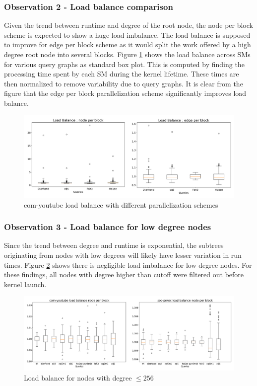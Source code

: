 {\subsubsection*{Observation 2 - Load balance comparison}
Given the trend between runtime and degree of the root node, the node per block scheme is expected to show a huge load imbalance.
The load balance is supposed to improve for edge per block scheme as it would split the work offered by a high degree root node into several blocks.
Figure \ref{fig:load-balance-baseline} shows the load balance across SMs for various query graphs as standard box plot. This is computed by finding the processing time spent by each SM during the kernel lifetime. These times are then normalized to remove variability due to query graphs. It is clear from the figure that the edge per block parallelization scheme significantly improves load balance.
\begin{figure}
    \includegraphics[width=\textwidth]{fig/improvements/yt_lb-baseline_byedge.png}
    \caption{com-youtube load balance with different parallelization schemes}
    \label{fig:load-balance-baseline}
\end{figure}

\subsubsection*{Observation 3 - Load balance for low degree nodes}
Since the trend between degree and runtime is exponential, the subtrees originating from nodes with low degrees will likely have lesser variation in run times.
Figure \ref{fig:load-balance-LD} shows there is negligible load imbalance for low degree nodes.
For these findings, all nodes with degree higher than cutoff were filtered out before kernel launch.
\begin{figure}
    \includegraphics[width=\textwidth]{fig/improvements/load-balance-LD.png}
    \caption{Load balance for nodes with degree $\leq 256$ }
    \label{fig:load-balance-LD}
\end{figure}

}
